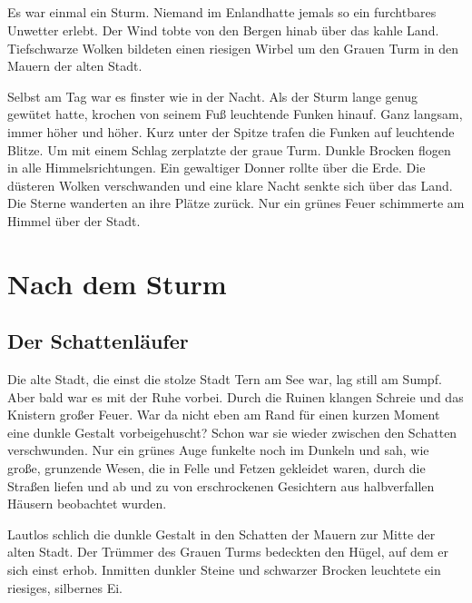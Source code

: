 \documentclass[12pt,a4paper,onecolumn,twoside,ngerman]{book}
\newcommand{\Tern}{Tern }
\newcommand{\Enland}{Enland}
\newcommand{\Schattenjager}{Schattenläufer}
\begin{document}
  
  


\paragraph{}
Es war einmal ein Sturm.
Niemand im \Enland hatte jemals so ein furchtbares Unwetter erlebt. Der Wind tobte von den Bergen hinab über das kahle Land. Tiefschwarze Wolken bildeten einen riesigen Wirbel um den Grauen Turm in den Mauern der alten Stadt. 

Selbst am Tag war es finster wie in der Nacht. Als der Sturm lange genug gewütet hatte, krochen von seinem Fuß leuchtende Funken hinauf. Ganz langsam, immer höher und höher. Kurz unter der Spitze trafen die Funken auf leuchtende Blitze. Um mit einem Schlag zerplatzte der graue Turm. Dunkle Brocken flogen in alle Himmelsrichtungen. Ein gewaltiger Donner rollte über die Erde. Die düsteren Wolken verschwanden und eine klare Nacht senkte sich über das Land. Die Sterne wanderten an ihre Plätze zurück. Nur ein grünes Feuer schimmerte am Himmel über der Stadt.

\chapter{Nach dem Sturm}
\section{Der \Schattenjager}
Die alte Stadt, die einst die stolze Stadt \Tern am See war, lag still am Sumpf. Aber bald war es mit der Ruhe vorbei. Durch die Ruinen klangen Schreie und das Knistern großer Feuer. War da nicht eben am Rand für einen kurzen Moment eine dunkle Gestalt vorbeigehuscht? Schon war sie wieder zwischen den Schatten verschwunden. Nur ein grünes Auge funkelte noch im Dunkeln und sah, wie große, grunzende Wesen, die in Felle und Fetzen gekleidet waren, durch die Straßen liefen und ab und zu von erschrockenen Gesichtern aus halbverfallen Häusern beobachtet wurden.

Lautlos schlich die dunkle Gestalt in den Schatten der Mauern zur Mitte der alten Stadt. Der Trümmer des Grauen Turms bedeckten den Hügel, auf dem er sich einst erhob. Inmitten dunkler Steine und schwarzer Brocken leuchtete ein riesiges, silbernes Ei. 
\end{document}
